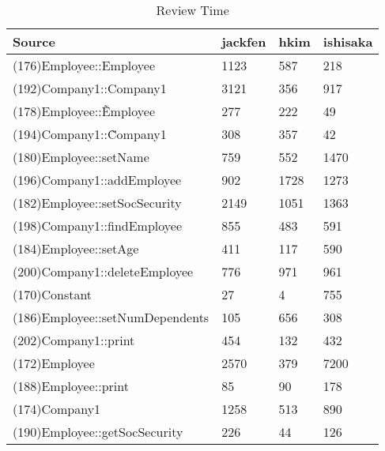\begin{table}[hb]
\begin{center}
\begin{tabular}{|l|l|l|l|}
\hline
Source & jackfen & hkim & ishisaka\\
\hline
(176)Employee::Employee & 1123 & 587 & 218\\
(192)Company1::Company1 & 3121 & 356 & 917\\
(178)Employee::\~Employee & 277 & 222 & 49\\
(194)Company1::\~Company1 & 308 & 357 & 42\\
(180)Employee::setName & 759 & 552 & 1470\\
(196)Company1::addEmployee & 902 & 1728 & 1273\\
(182)Employee::setSocSecurity & 2149 & 1051 & 1363\\
(198)Company1::findEmployee & 855 & 483 & 591\\
(184)Employee::setAge & 411 & 117 & 590\\
(200)Company1::deleteEmployee & 776 & 971 & 961\\
(170)Constant & 27 & 4 & 755\\
(186)Employee::setNumDependents & 105 & 656 & 308\\
(202)Company1::print & 454 & 132 & 432\\
(172)Employee & 2570 & 379 & 7200\\
(188)Employee::print & 85 & 90 & 178\\
(174)Company1 & 1258 & 513 & 890\\
(190)Employee::getSocSecurity & 226 & 44 & 126\\
\hline
\end{tabular}
\end{center}
\caption{Review Time}
\end{table}


